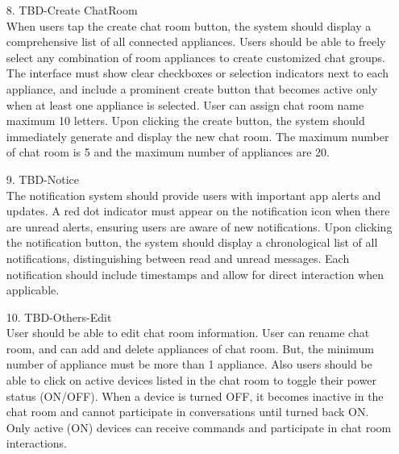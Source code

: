 \documentclass[conference]{IEEEtran}
\begin{document}
\begin{enumerate}
\begin{itemize}
\begin{itemize}
    \begin{enumerate}
        \item[8.] TBD-Create ChatRoom \\
        When users tap the create chat room button, the system should display a comprehensive list of all connected appliances. Users should be able to freely select any combination of room appliances to create customized chat groups. The interface must show clear checkboxes or selection indicators next to each appliance, and include a prominent create button that becomes active only when at least one appliance is selected. User can assign chat room name maximum 10 letters. Upon clicking the create button, the system should immediately generate and display the new chat room. The maximum number of chat room is 5 and the maximum number of appliances are 20. \\
    \end{enumerate}
    
    \begin{enumerate}
        \item[9.] TBD-Notice \\
        The notification system should provide users with important app alerts and updates. A red dot indicator must appear on the notification icon when there are unread alerts, ensuring users are aware of new notifications. Upon clicking the notification button, the system should display a chronological list of all notifications, distinguishing between read and unread messages. Each notification should include timestamps and allow for direct interaction when applicable. \\
    \end{enumerate}

    \begin{enumerate}
        \item[10.] TBD-Others-Edit \\
        User should be able to edit chat room information. User can rename chat room, and can add and delete appliances of chat room. But, the minimum number of appliance must be more than 1 appliance.
Also users should be able to click on active devices listed in the chat room to toggle their power status (ON/OFF). When a device is turned OFF, it becomes inactive in the chat room and cannot participate in conversations until turned back ON. Only active (ON) devices can receive commands and participate in chat room interactions. \\
    \end{enumerate}
  

\end{itemize}
\end{itemize}
\end{enumerate}
\end{document}
